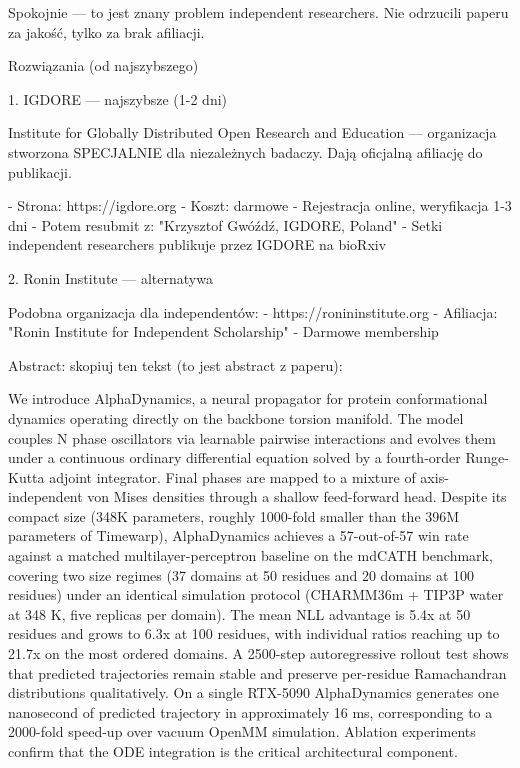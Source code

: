 Spokojnie — to jest znany problem independent researchers. Nie odrzucili paperu za jakość, tylko za brak afiliacji.

  Rozwiązania (od najszybszego)

  1. IGDORE — najszybsze (1-2 dni)

  Institute for Globally Distributed Open Research and Education — organizacja stworzona SPECJALNIE dla niezależnych badaczy. Dają oficjalną afiliację do publikacji.

  - Strona: https://igdore.org
  - Koszt: darmowe
  - Rejestracja online, weryfikacja 1-3 dni
  - Potem resubmit z: "Krzysztof Gwóźdź, IGDORE, Poland"
  - Setki independent researchers publikuje przez IGDORE na bioRxiv

  2. Ronin Institute — alternatywa

  Podobna organizacja dla independentów:
  - https://ronininstitute.org
  - Afiliacja: "Ronin Institute for Independent Scholarship"
  - Darmowe membership



Abstract: skopiuj ten tekst (to jest abstract z paperu):

  We introduce AlphaDynamics, a neural propagator for protein conformational dynamics operating directly on the backbone torsion manifold. The model couples N phase oscillators via learnable pairwise
  interactions and evolves them under a continuous ordinary differential equation solved by a fourth-order Runge-Kutta adjoint integrator. Final phases are mapped to a mixture of axis-independent von
  Mises densities through a shallow feed-forward head. Despite its compact size (348K parameters, roughly 1000-fold smaller than the 396M parameters of Timewarp), AlphaDynamics achieves a 57-out-of-57 win
   rate against a matched multilayer-perceptron baseline on the mdCATH benchmark, covering two size regimes (37 domains at 50 residues and 20 domains at 100 residues) under an identical simulation
  protocol (CHARMM36m + TIP3P water at 348 K, five replicas per domain). The mean NLL advantage is 5.4x at 50 residues and grows to 6.3x at 100 residues, with individual ratios reaching up to 21.7x on the
   most ordered domains. A 2500-step autoregressive rollout test shows that predicted trajectories remain stable and preserve per-residue Ramachandran distributions qualitatively. On a single RTX-5090
  AlphaDynamics generates one nanosecond of predicted trajectory in approximately 16 ms, corresponding to a 2000-fold speed-up over vacuum OpenMM simulation. Ablation experiments confirm that the ODE
  integration is the critical architectural component.

